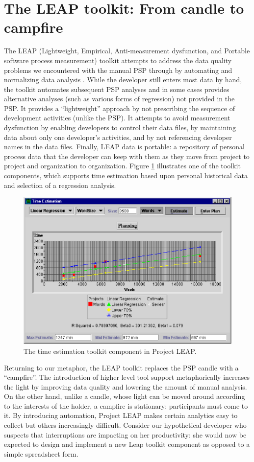 \documentclass[]{article}
\begin{document}
\section{The LEAP toolkit: From candle to campfire} 

The LEAP (Lightweight, Empirical, Anti-measurement dysfunction, and Portable software
process measurement) toolkit attempts to address the data quality problems we encountered with the manual
PSP through by automating and normalizing data analysis
\cite{csdl-99-08}.  While the developer still enters most data by hand, the
toolkit automates subsequent PSP analyses and in some cases provides alternative
analyses (such as various forms of regression) not provided in the PSP.  It provides a
``lightweight'' approach by not prescribing the sequence of development activities 
(unlike the PSP). It attempts to avoid measurement dysfunction by enabling
developers to control their data files, by maintaining data about only one developer's
activities, and by not referencing developer names in the data files. Finally, LEAP data
is portable: a repository of personal process data that the developer can
keep with them as they move from project to project and organization to organization.
Figure \ref{fig:leap} illustrates one of the toolkit components, which supports time
estimation based upon personal historical data and selection of a regression analysis.

\begin{figure}[!tb]
\centering
\includegraphics[width=0.50\columnwidth]{planword.eps}
\caption{The time estimation toolkit component in Project LEAP.}
\label{fig:leap}
\end{figure}

Returning to our metaphor, the LEAP toolkit replaces the PSP candle with a
``campfire''.  The introduction of higher level tool support metaphorically increases the
light by improving data quality and lowering the amount of manual analysis.  On the other
hand, unlike a candle, whose light can be moved around according to the interests
of the holder, a campfire is stationary: participants must come to it.  By introducing
automation, Project LEAP makes certain analytics easy to collect but others
increasingly difficult.  Consider our hypothetical developer who suspects that
interruptions are impacting on her productivity: she would now be expected to design and
implement a new Leap toolkit component as opposed to a simple spreadsheet form.  
\end{document}
